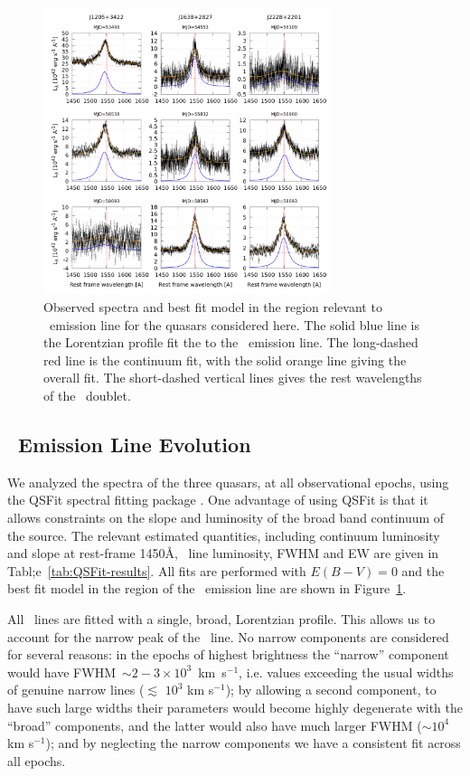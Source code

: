 \documentclass[fleqn,usenatbib]{mnras}
\begin{document}
\begin{figure}
  \centering
  \includegraphics[width=8.40cm, trim=0.37cm 0.3cm 0.0cm 0.2cm, clip]{figures/CIVregions.png}
    \vspace{-18pt}
  \caption{Observed spectra and best fit model in the region relevant
    to \civ\ emission line for the quasars considered here.
    The solid blue line is the Lorentzian profile fit the to the \civ\ emission line.
    The long-dashed red line is the continuum fit, with the solid orange
    line giving the overall fit. The short-dashed vertical lines gives the
    rest wavelengths of the \civ\ doublet. }
  \label{fig:QSFit-CIV}
\end{figure}
\subsection{\civ\ Emission Line Evolution}
We analyzed the spectra of the three quasars, at all observational
epochs, using the QSFit spectral fitting package
\citep{Calderone2017}.  One advantage of using QSFit is that it allows
constraints on the slope and luminosity of the broad band continuum of
the source. The relevant estimated quantities, including continuum
luminosity and slope at rest-frame 1450\AA, \civ\ line luminosity,
FWHM and EW are given in Tabl;e~\ref{tab:QSFit-results}. All fits are
performed with $E(B-V) = 0$ and the best fit model in the region of
the \civ\ emission line are shown in Figure~\ref{fig:QSFit-CIV}.

All \civ\ lines are fitted with a single, broad, Lorentzian profile.
This allows us to account for the narrow peak of the \civ\ line.  No
narrow components are considered for several reasons: in the epochs of
highest brightness the ``narrow'' component would have FWHM~$\sim2-3
\times 10^{3}$~km~s$^{-1}$, i.e. values exceeding the usual widths of
genuine narrow lines ($\lesssim$ $10^3$ km s$^{-1}$); by allowing a
second component, to have such large widths their parameters would
become highly degenerate with the ``broad'' components, and the latter
would also have much larger FWHM ($\sim$$10^{4}$ km s$^{-1}$); and by
neglecting the narrow components we have a consistent fit across all
epochs.
\end{document}
